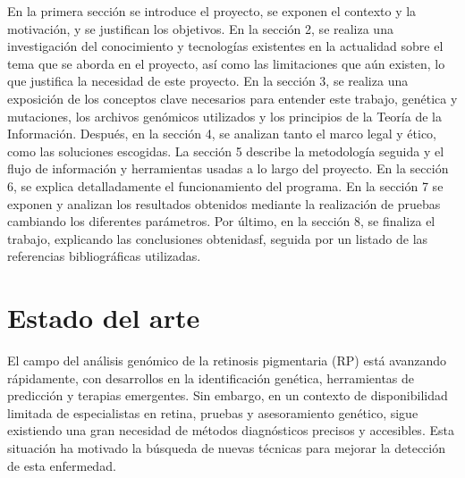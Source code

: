 \documentclass[11pt,spanish,listoffigures,listoftables]{tfgetsinf}
\begin{document}
En la primera sección se introduce el proyecto, se exponen el contexto y la motivación, y se justifican los objetivos. En la sección 2, se realiza una investigación del conocimiento y tecnologías existentes en la actualidad sobre el tema que se aborda en el proyecto, así como las limitaciones que aún existen, lo que justifica la necesidad de este proyecto. En la sección 3, se realiza una exposición de los conceptos clave necesarios para entender este trabajo, genética y mutaciones, los archivos genómicos utilizados y los principios de la Teoría de la Información. Después, en la sección 4, se analizan tanto el marco legal y ético, como las soluciones escogidas. La sección 5 describe la metodología seguida y el flujo de información y herramientas usadas a lo largo del proyecto. En la sección 6, se explica detalladamente el funcionamiento del programa. En la sección 7 se exponen y analizan los resultados obtenidos mediante la realización de pruebas cambiando los diferentes parámetros. Por último, en la sección 8, se finaliza el trabajo, explicando las conclusiones obtenidasf, seguida por un listado de las referencias bibliográficas utilizadas. 





\chapter{Estado del arte}

El campo del análisis genómico de la retinosis pigmentaria (\acs{RP}) está avanzando rápidamente, con desarrollos en la identificación genética, herramientas de predicción y terapias emergentes. Sin embargo, en un contexto de disponibilidad limitada de especialistas en retina, pruebas y asesoramiento genético, sigue existiendo una gran necesidad de métodos diagnósticos precisos y accesibles. Esta situación ha motivado la búsqueda de nuevas técnicas para mejorar la detección de esta enfermedad.
\end{document}
